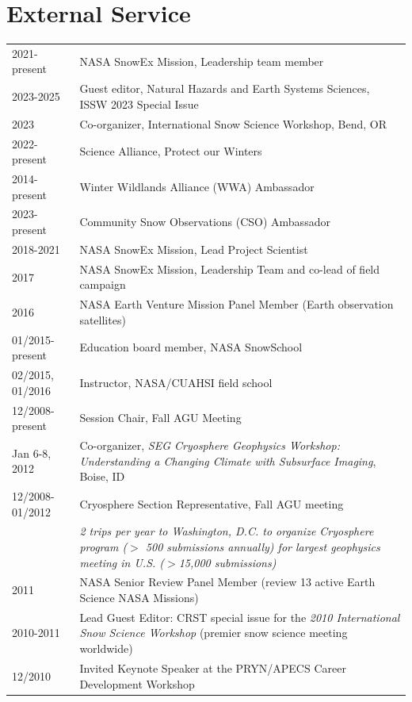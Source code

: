 \documentclass[11pt]{article}
\renewcommand\arraystretch{1}
\begin{document}
\section*{External Service}
\begingroup
\renewcommand\arraystretch{0.7}
\begin{longtable}{p{1.2in}|p{5.7in}}
2021-present & NASA SnowEx Mission, Leadership team member \\
2023-2025 & Guest editor, Natural Hazards and Earth Systems Sciences, ISSW 2023 Special Issue \\
2023 & Co-organizer, International Snow Science Workshop, Bend, OR \\ 
2022-present & Science Alliance, Protect our Winters \\
2014-present & Winter Wildlands Alliance (WWA) Ambassador \\
2023- present & Community Snow Observations (CSO) Ambassador \\
2018-2021 & NASA SnowEx Mission, Lead Project Scientist \\
2017 & NASA SnowEx Mission, Leadership Team and co-lead of field campaign \\
2016 & NASA Earth Venture Mission Panel Member (Earth observation satellites) \\
01/2015-present & Education board member, NASA SnowSchool \\
02/2015, 01/2016 & Instructor, NASA/CUAHSI field school \\
12/2008-present & Session Chair, Fall AGU Meeting \\
Jan 6-8, 2012 & Co-organizer, \textit{SEG Cryosphere Geophysics Workshop: Understanding a Changing Climate with Subsurface Imaging}, Boise, ID \\
12/2008-01/2012 & Cryosphere Section Representative, Fall AGU meeting \\
&\textit{2 trips per year to Washington, D.C. to organize Cryosphere program ($>$ 500 
submissions annually) for largest geophysics meeting in U.S. ($>$15,000 submissions)} \\
2011 & NASA Senior Review Panel Member (review 13 active Earth Science NASA Missions)  \\
2010-2011 & Lead Guest Editor: CRST special issue for the \textit{2010 International Snow
Science Workshop} (premier snow science meeting worldwide) \\
12/2010 & Invited Keynote Speaker at the PRYN/APECS Career Development Workshop \\


\end{longtable}
\end{document}
